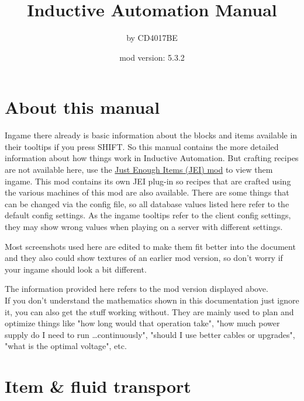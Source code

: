 \documentclass[11pt]{article} %
\title{Inductive Automation Manual}
\author{by CD4017BE}
\date{mod version: 5.3.2}
\begin{document}
 \maketitle
 \tableofcontents
 
 \section{About this manual}  
  Ingame there already is basic information about the blocks and items available in their tooltips if you press SHIFT. So this manual contains the more detailed information about how things work in Inductive Automation. But crafting recipes are not available here, use the \href{http://minecraft.curseforge.com/projects/just-enough-items-jei}{Just Enough Items (JEI) mod} to view them ingame. This mod contains its own JEI plug-in so recipes that are crafted using the various machines of this mod are also available. There are some things that can be changed via the config file, so all database values listed here refer to the default config settings. As the ingame tooltips refer to the client config settings, they may show wrong values when playing on a server with different settings.

Most screenshots used here are edited to make them fit better into the document and they also could show textures of an earlier mod version, so don't worry if your ingame should look a bit different. 

The information provided here refers to the mod version displayed above.
\\
If you don't understand the mathematics shown in this documentation just ignore it, you can also get the stuff working without. They are mainly used to plan and optimize things like "how long would that operation take", "how much power supply do I need to run \dots continuously", "should I use better cables or upgrades", "what is the optimal voltage", etc.

\newpage
\section{Item \& fluid transport}
\end{document}

